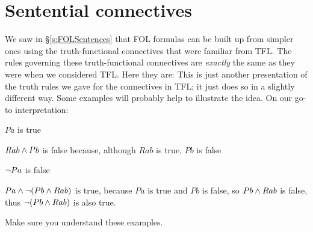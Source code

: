 \section{Sentential connectives}
We saw in \S\ref{s:FOLSentences} that FOL formulas can be built up from simpler ones using the truth-functional connectives that were familiar from TFL. The rules governing these truth-functional connectives are \emph{exactly} the same as they were when we considered TFL. Here they are:
This is just another presentation of the truth rules we gave for the connectives in TFL; it just does so in a slightly different way. Some examples will probably help to illustrate the idea. On our go-to interpretation:
	\begin{earg}
		\item[\textbullet] $ Pa$ is true
		\item[\textbullet] $Rab \mathbin{\wedge} Pb$ is false because, although $Rab$ is true, $Pb$ is false
		\item[\textbullet] $\neg Pa$ is false
		\item[\textbullet] $Pa \mathbin{\wedge} \neg(Pb\mathbin{\wedge} Rab)$ is true, because $Pa$ is true and $Pb$ is false, so $Pb\mathbin{\wedge} Rab$ is false, thus $\neg (Pb\mathbin{\wedge} Rab)$ is also true.
	\end{earg}
Make sure you understand these examples.

